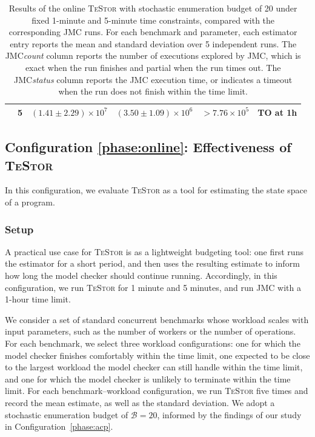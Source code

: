 \documentclass[acmsmall]{acmart}
\newcommand{\testor}{\textsc{TeStor}\xspace}
\newcommand{\jmc}{\textsc{JMC}\xspace}
\begin{document}
\begin{table}[tbp]
\begin{tabular}{llcccc}
 & 5 & $(1.41 \pm 2.29) \times 10^{7}$ & $(3.50 \pm 1.09) \times 10^{6}$ & $>7.76 \times 10^{5}$ & TO at 1h  \\
\bottomrule
\end{tabular}
\vspace{7pt}
\caption{Results of the online \testor with stochastic enumeration budget of 20 under fixed 1-minute and 5-minute time constraints, compared with the corresponding \jmc runs. For each benchmark and parameter, each estimator entry reports the mean and standard deviation over 5 independent runs. The \jmc \textit{count} column reports the number of executions explored by \jmc, which is exact when the run finishes and partial when the run times out. The \jmc \textit{status} column reports the \jmc execution time, or indicates a timeout when the run does not finish within the time limit.}
\label{tab:online-estimator-results}
\end{table}



\subsection{Configuration \ref{phase:online}: Effectiveness of \testor}

In this configuration, we evaluate \testor as a tool for estimating the state space of a program.

\subsubsection*{Setup}

A practical use case for \testor is as a lightweight budgeting tool: one first runs the estimator for a short period, and then uses the resulting estimate to inform how long the model checker should continue running.
Accordingly, in this configuration, we run \testor for 1 minute and 5 minutes, and run \jmc with a 1-hour time limit.

We consider a set of standard concurrent benchmarks whose workload scales with input parameters, such as the number of workers or the number of operations.
For each benchmark, we select three workload configurations: one for which the model checker finishes comfortably within the time limit, one expected to be close to the largest workload the model checker can still handle within the time limit, and one for which the model checker is unlikely to terminate within the time limit.
For each benchmark–workload configuration, we run \testor five times and record the mean estimate, as well as the standard deviation.
We adopt a stochastic enumeration budget of $\mathcal{B} = 20$, informed by the findings of our study in Configuration~\ref{phase:acp}.
\end{document}
